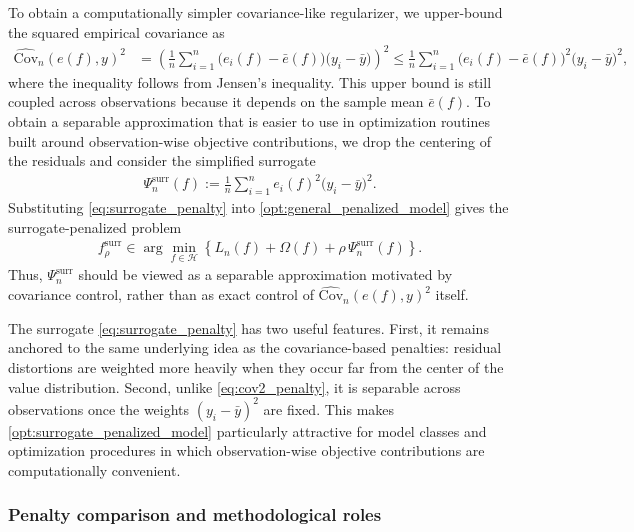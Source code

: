 \documentclass[12pt, draft]{article}
\theoremstyle{plain}
\theoremstyle{definition}
\newcommand{\1}{\mathbf{1}}
\newcommand{\Cov}{\text{Cov}}
\renewcommand{\H}{\mathcal{H}}
\begin{document}
{To obtain a computationally simpler covariance-like regularizer, we upper-bound the squared empirical covariance as
\begin{align}
    \label{eq:covariance_upper_bound}
    \widehat{\Cov}_n(e(f),y)^2
    &=
    \left(
        \frac{1}{n}\sum_{i=1}^n
        \bigl(e_i(f)-\bar e(f)\bigr)\bigl(y_i-\bar y\bigr)
    \right)^2
    \le
    \frac{1}{n}\sum_{i=1}^n
    \bigl(e_i(f)-\bar e(f)\bigr)^2
    \bigl(y_i-\bar y\bigr)^2,
\end{align}
where the inequality follows from Jensen's inequality. This upper bound is still coupled across observations because it depends on the sample mean $\bar e(f)$. To obtain a separable approximation that is easier to use in optimization routines built around observation-wise objective contributions, we drop the centering of the residuals and consider the simplified surrogate
\begin{align}
    \label{eq:surrogate_penalty}
    \Psi_n^{\mathrm{surr}}(f)
    :=
    \frac{1}{n}\sum_{i=1}^n
    e_i(f)^2\bigl(y_i-\bar y\bigr)^2.
\end{align}
Substituting \eqref{eq:surrogate_penalty} into \eqref{opt:general_penalized_model} gives the surrogate-penalized problem
\begin{align}
    \label{opt:surrogate_penalized_model}
    f_{\rho}^{\mathrm{surr}}
    \in
    \arg\min_{f\in\H}
    \left\{
        L_n(f)+\Omega(f)
        +
        \rho\,\Psi_n^{\mathrm{surr}}(f)
    \right\}.
\end{align}
Thus, $\Psi_n^{\mathrm{surr}}$ should be viewed as a separable approximation motivated by covariance control, rather than as exact control of $\widehat{\Cov}_n(e(f),y)^2$ itself.

The surrogate \eqref{eq:surrogate_penalty} has two useful features. First, it remains anchored to the same underlying idea as the covariance-based penalties: residual distortions are weighted more heavily when they occur far from the center of the value distribution. Second, unlike \eqref{eq:cov2_penalty}, it is separable across observations once the weights $(y_i-\bar y)^2$ are fixed. This makes \eqref{opt:surrogate_penalized_model} particularly attractive for model classes and optimization procedures in which observation-wise objective contributions are computationally convenient.

\subsubsection{Penalty comparison and methodological roles}

}
\end{document}
